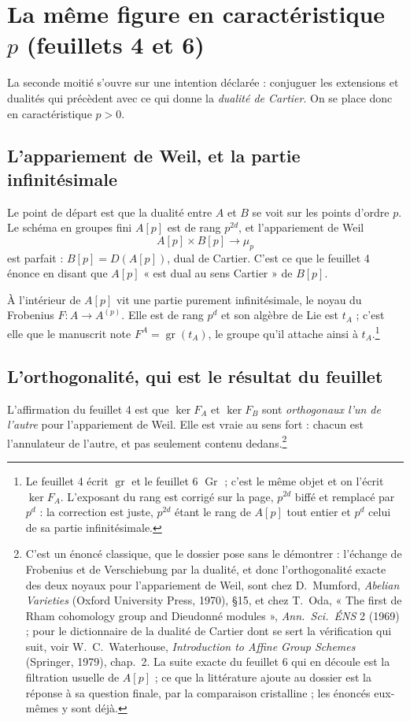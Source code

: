 \documentclass[11pt,a4paper]{article}
\begin{document}
\section*{La même figure en caractéristique $p$ (feuillets 4 et 6)}

La seconde moitié s'ouvre sur une intention déclarée :
conjuguer les extensions et dualités qui précèdent avec ce qui donne la
\emph{dualité de Cartier}. On se place donc en caractéristique $p > 0$.

\subsection*{L'appariement de Weil, et la partie infinitésimale}

Le point de départ est que la dualité entre $A$ et $B$ se voit sur les points
d'ordre $p$. Le schéma en groupes fini $A[p]$ est de rang $p^{2d}$, et
l'appariement de Weil
\[
  A[p] \times B[p] \longrightarrow \mu_p
\]
est parfait : $B[p] = D(A[p])$, dual de Cartier. C'est ce que le feuillet 4
énonce en disant que $A[p]$ « est dual au sens Cartier » de $B[p]$.

À l'intérieur de $A[p]$ vit une partie purement infinitésimale, le noyau du
Frobenius $F : A \to A^{(p)}$. Elle est de rang $p^d$ et son algèbre de Lie est
$t_A$ ; c'est elle que le manuscrit note $F^A = \operatorname{gr}(t_A)$, le
groupe qu'il attache ainsi à $t_A$.\footnote{Le feuillet 4 écrit
$\operatorname{gr}$ et le
feuillet 6 $\operatorname{Gr}$ ; c'est le même objet et on l'écrit $\ker F_A$.
L'exposant du rang est corrigé sur la page, $p^{2d}$ biffé et remplacé par
$p^{d}$ : la correction est juste, $p^{2d}$ étant le rang de $A[p]$ tout entier
et $p^{d}$ celui de sa partie infinitésimale.}

\subsection*{L'orthogonalité, qui est le résultat du feuillet}

L'affirmation du feuillet 4 est que $\ker F_A$ et $\ker F_B$ sont
\emph{orthogonaux l'un de l'autre} pour l'appariement de Weil. Elle est vraie
au sens fort : chacun est l'annulateur de l'autre, et pas seulement contenu
dedans.\footnote{C'est un énoncé classique, que le dossier pose sans le
démontrer : l'échange de Frobenius et de Verschiebung par la dualité, et donc
l'orthogonalité exacte des deux noyaux pour l'appariement de Weil, sont chez
D.~Mumford, \emph{Abelian Varieties} (Oxford University Press, 1970), §15, et
chez T.~Oda, « The first de Rham cohomology group and Dieudonné modules »,
\emph{Ann.\ Sci.\ ÉNS} 2 (1969) ; pour le dictionnaire de la dualité de
Cartier dont se sert la vérification qui suit, voir W.~C.~Waterhouse,
\emph{Introduction to Affine Group Schemes} (Springer, 1979), chap.~2. La suite
exacte du feuillet 6 qui en découle est la filtration usuelle de $A[p]$ ; ce
que la littérature ajoute au dossier est la réponse à sa question finale,
par la comparaison cristalline ; les énoncés eux-mêmes y sont déjà.}
\end{document}
